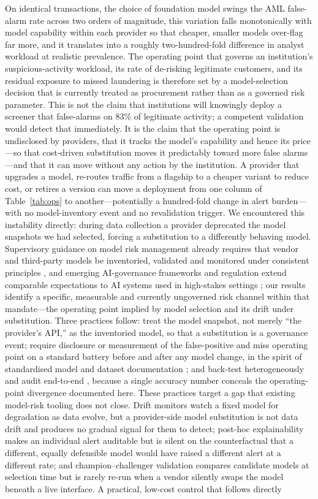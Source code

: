 \documentclass[lineno,pdflatex,sn-basic,Numbered]{sn-jnl}
\begin{document}
On identical transactions, the choice of foundation model swings the AML false-alarm rate across two orders of magnitude, this variation falls monotonically with model capability within each provider so that cheaper, smaller models over-flag far more, and it translates into a roughly two-hundred-fold difference in analyst workload at realistic prevalence. The operating point that governs an institution's suspicious-activity workload, its rate of de-risking legitimate customers, and its residual exposure to missed laundering is therefore set by a model-selection decision that is currently treated as procurement rather than as a governed risk parameter. This is not the claim that institutions will knowingly deploy a screener that false-alarms on 83\% of legitimate activity; a competent validation would detect that immediately. It is the claim that the operating point is undisclosed by providers, that it tracks the model's capability and hence its price---so that cost-driven substitution moves it predictably toward more false alarms---and that it can move without any action by the institution. A provider that upgrades a model, re-routes traffic from a flagship to a cheaper variant to reduce cost, or retires a version can move a deployment from one column of Table~\ref{tab:ops} to another---potentially a hundred-fold change in alert burden---with no model-inventory event and no revalidation trigger. We encountered this instability directly: during data collection a provider deprecated the model snapshots we had selected, forcing a substitution to a differently behaving model. Supervisory guidance on model risk management already requires that vendor and third-party models be inventoried, validated and monitored under consistent principles \cite{srguidance}, and emerging AI-governance frameworks and regulation extend comparable expectations to AI systems used in high-stakes settings \cite{nistrmf,aiact}; our results identify a specific, measurable and currently ungoverned risk channel within that mandate---the operating point implied by model selection and its drift under substitution. Three practices follow: treat the model snapshot, not merely ``the provider's API,'' as the inventoried model, so that a substitution is a governance event; require disclosure or measurement of the false-positive and miss operating point on a standard battery before and after any model change, in the spirit of standardised model and dataset documentation \cite{modelcards,datasheets}; and back-test heterogeneously and audit end-to-end \cite{accountability}, because a single accuracy number conceals the operating-point divergence documented here. These practices target a gap that existing model-risk tooling does not close. Drift monitors watch a fixed model for degradation as data evolve, but a provider-side model substitution is not data drift and produces no gradual signal for them to detect; post-hoc explainability makes an individual alert auditable but is silent on the counterfactual that a different, equally defensible model would have raised a different alert at a different rate; and champion--challenger validation compares candidate models at selection time but is rarely re-run when a vendor silently swaps the model beneath a live interface. A practical, low-cost control that follows directly 
\end{document}
